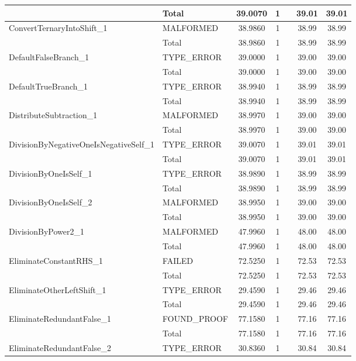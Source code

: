 \begin{appendices}
\begin{longtable}{L{0.25\textwidth} L{0.2\textwidth}  c  c  c  c  c }
    & Total & 39.0070 & 1 &  & 39.01 & 39.01 \\ \midrule 
    ConvertTernaryIntoShift\_1 & MALFORMED & 38.9860 & 1 &  & 38.99 & 38.99 \\ \midrule 
    & Total & 38.9860 & 1 &  & 38.99 & 38.99 \\ \midrule 
    DefaultFalseBranch\_1 & TYPE\_ERROR & 39.0000 & 1 &  & 39.00 & 39.00 \\ \midrule 
    & Total & 39.0000 & 1 &  & 39.00 & 39.00 \\ \midrule 
    DefaultTrueBranch\_1 & TYPE\_ERROR & 38.9940 & 1 &  & 38.99 & 38.99 \\ \midrule 
    & Total & 38.9940 & 1 &  & 38.99 & 38.99 \\ \midrule 
    DistributeSubtraction\_1 & MALFORMED & 38.9970 & 1 &  & 39.00 & 39.00 \\ \midrule 
    & Total & 38.9970 & 1 &  & 39.00 & 39.00 \\ \midrule 
    DivisionByNegativeOneIsNegativeSelf\_1 & TYPE\_ERROR & 39.0070 & 1 &  & 39.01 & 39.01 \\ \midrule 
    & Total & 39.0070 & 1 &  & 39.01 & 39.01 \\ \midrule 
    DivisionByOneIsSelf\_1 & TYPE\_ERROR & 38.9890 & 1 &  & 38.99 & 38.99 \\ \midrule 
    & Total & 38.9890 & 1 &  & 38.99 & 38.99 \\ \midrule 
    DivisionByOneIsSelf\_2 & MALFORMED & 38.9950 & 1 &  & 39.00 & 39.00 \\ \midrule 
    & Total & 38.9950 & 1 &  & 39.00 & 39.00 \\ \midrule 
    DivisionByPower2\_1 & MALFORMED & 47.9960 & 1 &  & 48.00 & 48.00 \\ \midrule 
    & Total & 47.9960 & 1 &  & 48.00 & 48.00 \\ \midrule 
    EliminateConstantRHS\_1 & FAILED & 72.5250 & 1 &  & 72.53 & 72.53 \\ \midrule 
    & Total & 72.5250 & 1 &  & 72.53 & 72.53 \\ \midrule 
    EliminateOtherLeftShift\_1 & TYPE\_ERROR & 29.4590 & 1 &  & 29.46 & 29.46 \\ \midrule 
    & Total & 29.4590 & 1 &  & 29.46 & 29.46 \\ \midrule 
    EliminateRedundantFalse\_1 & FOUND\_PROOF & 77.1580 & 1 &  & 77.16 & 77.16 \\ \midrule 
    & Total & 77.1580 & 1 &  & 77.16 & 77.16 \\ \midrule 
    EliminateRedundantFalse\_2 & TYPE\_ERROR & 30.8360 & 1 &  & 30.84 & 30.84 \\ \midrule 

\end{longtable}
\end{appendices}
